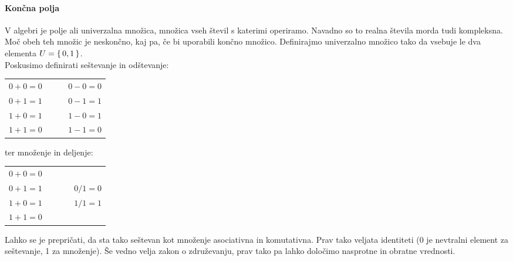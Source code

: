 \documentclass[12pt]{article}
\begin{document}
            \paragraph{Končna polja}
                V algebri je polje ali univerzalna množica, množica vseh števil
                s katerimi operiramo. Navadno so to realna števila morda tudi
                kompleksna. Moč obeh teh množic je neskončno, kaj pa, če bi
                uporabili končno množico. Definirajmo univerzalno množico tako 
                da vsebuje le dva elementa $U = \set{0, 1}$.\\
                Poskusimo definirati seštevanje in odštevanje:\\
                \begin{table}[h!]
                    \centering
                    \begin{tabular}{l p{0.2\linewidth}}
                        $0 + 0 = 0$  & $0 - 0 = 0$ \\
                        $0 + 1 = 1$  & $0 - 1 = 1$ \\
                        $1 + 0 = 1$  & $1 - 0 = 1$ \\
                        $1 + 1 = 0$  & $1 - 1 = 0$ \\
                    \end{tabular}
                \end{table}

                ter množenje in deljenje:\\
                \begin{table}[h!]
                    \centering
                    \begin{tabular}{l p{0.2\linewidth}}
                        $0 + 0 = 0$  &  \\
                        $0 + 1 = 1$  & $0 / 1 = 0$\\
                        $1 + 0 = 1$  & $1 / 1 = 1$\\
                        $1 + 1 = 0$  &  \\
                    \end{tabular}
                \end{table}

                Lahko se je prepričati, da sta tako seštevan kot množenje
                asociativna in komutativna. Prav tako veljata identiteti (0 je 
                nevtralni element za seštevanje, 1 za množenje). Še vedno velja 
                zakon o združevanju, prav tako pa lahko določimo nasprotne in 
                obratne vrednosti. 
\end{document}
